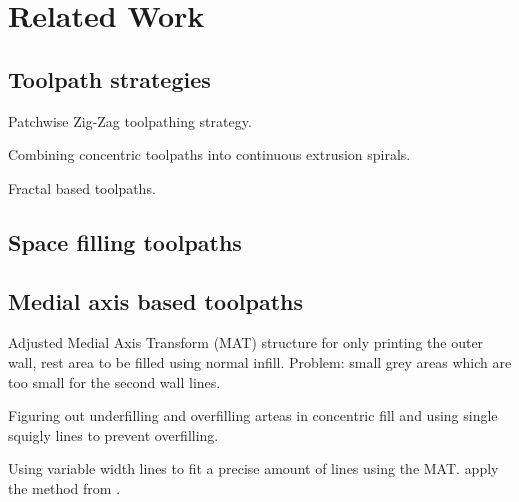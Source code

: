 \section{Related Work}

\subsection{Toolpath strategies}

Patchwise Zig-Zag toolpathing strategy. \cite{Ding2014}

Combining concentric toolpaths into continuous extrusion spirals. \cite{Held2009}

Fractal based toolpaths. \cite{Griffiths1994, mandal2016}

\subsection{Space filling toolpaths}


\subsection{Medial axis based toolpaths}
Adjusted Medial Axis Transform (MAT) structure for only printing the outer wall, rest area to be filled using normal infill. \cite{Moesen2011}
Problem: small grey areas which are too small for the second wall lines.

Figuring out underfilling and overfilling arteas in concentric fill and using single squigly lines to prevent overfilling. \cite{Jin2017}

Using variable width lines to fit a precise amount of lines using the MAT.
\cite{Ding2016a} apply the method from \cite{kao1998optimal}.

